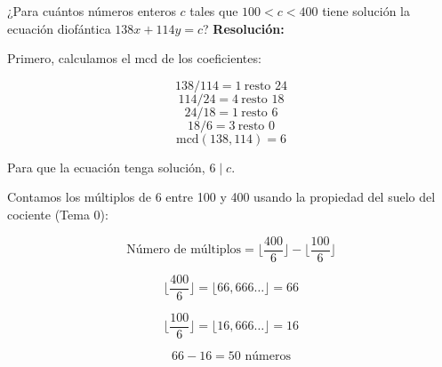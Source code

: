 \documentclass[a4paper,12pt]{article}
\begin{document}
\begin{ejercicio}[title=Ejercicio 13]
¿Para cuántos números enteros $c$ tales que $100 < c < 400$ tiene solución la ecuación diofántica $138x + 114y = c$?
\tcblower
\textbf{Resolución:}

Primero, calculamos el mcd de los coeficientes:

\[
138 / 114 = 1 \ \text{resto } 24
\]
\[
114 / 24 = 4 \ \text{resto } 18
\]
\[
24 / 18 = 1 \ \text{resto } \boxed{6}
\]
\[
18 / 6 = 3 \ \text{resto } 0
\]
\[
\text{mcd}(138,114) = \boxed{6}
\]

Para que la ecuación tenga solución, $6 \mid c$.

\vspace{0.5em}

Contamos los múltiplos de 6 entre 100 y 400 usando la propiedad del suelo del cociente (Tema 0):

\[
\text{Número de múltiplos} = \Big\lfloor \frac{400}{6} \Big\rfloor - \Big\lfloor \frac{100}{6} \Big\rfloor
\]

\[
\Big\lfloor \frac{400}{6} \Big\rfloor = \lfloor 66,666\ldots \rfloor = 66
\]

\[
\Big\lfloor \frac{100}{6} \Big\rfloor = \lfloor 16,666\ldots \rfloor = 16
\]

\[
66 - 16 = \boxed{50\text{ números}}
\]
\end{ejercicio}
\end{document}
